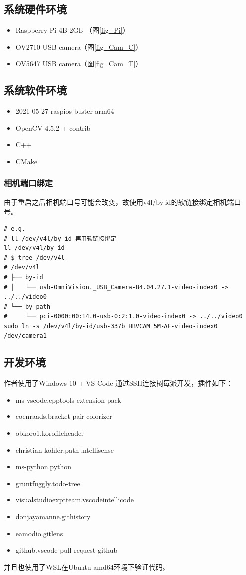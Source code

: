\documentclass[a4paper,11pt,UTF8]{ctexart}
\begin{document}
\subsection{系统硬件环境}
\begin{itemize}
  \item Raspberry Pi 4B 2GB （图\ref{fig_Pi}）
  \item OV2710 USB camera（图\ref{fig_Cam_C}）
  \item OV5647 USB camera（图\ref{fig_Cam_T}）
\end{itemize}
\subsection{系统软件环境}
\begin{itemize}
  \item 2021-05-27-raspios-buster-arm64
  \item OpenCV 4.5.2 + contrib
  \item C++
  \item CMake
\end{itemize}

\newpage

\subsubsection{相机端口绑定}
由于重启之后相机端口号可能会改变，故使用v4l/by-id的软链接绑定相机端口号。
\begin{lstlisting}[caption={相机端口绑定},captionpos=b]
# e.g.
# ll /dev/v4l/by-id 再用软链接绑定
ll /dev/v4l/by-id 
# $ tree /dev/v4l
# /dev/v4l
# ├── by-id
# │   └── usb-OmniVision._USB_Camera-B4.04.27.1-video-index0 -> ../../video0
# └── by-path
#     └── pci-0000:00:14.0-usb-0:2:1.0-video-index0 -> ../../video0
sudo ln -s /dev/v4l/by-id/usb-337b_HBVCAM_5M-AF-video-index0 /dev/camera1
\end{lstlisting}

\subsection{开发环境}
作者使用了Windows 10 + VS Code 通过SSH连接树莓派开发，插件如下：
\begin{itemize}
  \item ms-vscode.cpptools-extension-pack
  \item coenraads.bracket-pair-colorizer
  \item obkoro1.korofileheader
  \item christian-kohler.path-intellisense
  \item ms-python.python
  \item gruntfuggly.todo-tree
  \item visualstudioexptteam.vscodeintellicode
  \item donjayamanne.githistory
  \item eamodio.gitlens
  \item github.vscode-pull-request-github
\end{itemize}
并且也使用了WSL在Ubuntu amd64环境下验证代码。
\end{document}
